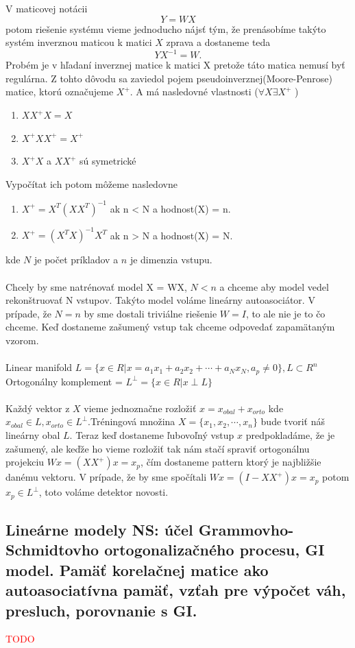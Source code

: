 \documentclass{article}
\numberwithin{equation}{section} %
\begin{document}
V maticovej notácii $$Y = WX$$ potom riešenie systému vieme jednoducho nájsť tým, že prenásobíme takýto systém inverznou maticou k matici $X$ zprava a dostaneme teda $$YX^{-1} = W.$$Probém je v hľadaní inverznej matice k matici X pretože táto matica nemusí byť regulárna. Z tohto dôvodu sa zaviedol pojem pseudoinverznej(Moore-Penrose) matice, ktorú označujeme $X^+$. A má nasledovné vlastnosti ($\forall X \exists X^+$ )
\begin{enumerate}
\item $XX^+X = X$
\item $X^+XX^+ = X^+$
\item $X^+X$ a $XX^+$ sú symetrické
\end{enumerate}
Vypočítat ich potom môžeme nasledovne
\begin{enumerate}
\item $X^+ = X^T(XX^T)^{-1}$ ak n < N a hodnost(X) = n.
\item $X^+ = (X^TX)^{-1}X^T$ ak n > N a hodnost(X) = N.
\end{enumerate}
kde $N$ je počet príkladov a $n$ je dimenzia vstupu.
\\\\
Chcely by sme natrénovať model X = WX, $N < n$ a chceme aby model vedel rekonštruovať N vstupov. Takýto model voláme lineárny autoasociátor. V prípade, že $N=n$ by sme dostali triviálne  riešenie $W = I$, to ale nie je to čo chceme. Keď dostaneme zašumený vstup tak chceme odpovedať zapamätaným vzorom. 
\\\\
Linear manifold $L = \{ x \in R | x = a_1x_1 + a_2x_2 + \cdots + a_Nx_N, a_p \neq 0 \} , L \subset R^n$ \\
Ortogonálny komplement = $L^{\perp} = \{x \in R | x \perp L\}$ \\\\
Každý vektor z $X$ vieme jednoznačne rozložiť $ x = x_{obal} + x_{orto}$ kde $x_{obal} \in L, x_{orto} \in L^{\perp}$.Tréningová množina $X = \{ x_1, x_2, \cdots, x_n\}$ bude tvoriť náš lineárny obal $L$. Teraz keď dostaneme ľubovoľný vstup $x$ predpokladáme, že je zašumený, ale keďže ho vieme rozložiť tak nám stačí spraviť ortogonálnu projekciu $Wx = (XX^+)x = x_p$, čím dostaneme pattern ktorý je najbližšie danému vektoru. V prípade, že by sme spočítali $Wx = (I - XX^+)x = x_p$ potom $x_p \in L^{\perp}$, toto voláme detektor novosti.


\subsection{Lineárne modely NS: účel Grammovho-Schmidtovho ortogonalizačného procesu, GI model. Pamäť korelačnej matice ako autoasociatívna pamäť, vzťah pre výpočet váh, presluch, porovnanie s GI.}
\textcolor{red}{TODO}
\end{document}
